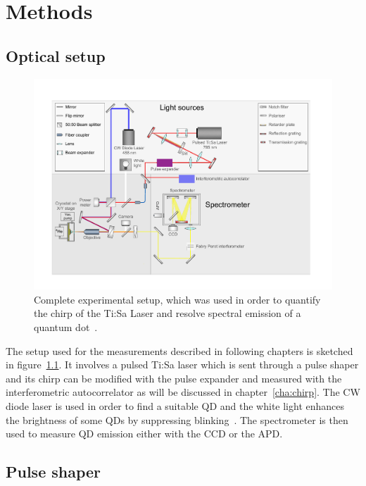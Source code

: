 \chapter{Methods}
\label{cha:methods}

\section{Optical setup}

\begin{figure}[H]
	\centering
	\includegraphics[width=1\linewidth]{figures/setup/Setup_flat}
	\caption[Complete experimental setup]{Complete experimental setup, which was used in order to quantify the chirp of the Ti:Sa Laser and resolve spectral emission of a quantum dot~\cite{schimpf_towards_2017}.}
	\label{fig:setupflat}
\end{figure}


The setup used for the measurements described in following chapters is sketched in figure~\ref{fig:setupflat}.
It involves a pulsed Ti:Sa laser which is sent through a pulse shaper and its chirp can be modified with the pulse expander and measured with the interferometric autocorrelator as will be discussed in chapter~\ref{cha:chirp}.
The CW diode laser is used in order to find a suitable \ac{QD} and the white light enhances the brightness of some \acp{QD} by suppressing blinking~\cite{jahn_artificial_2015}.
The spectrometer is then used to measure \ac{QD} emission either with the CCD or the APD.  

\section{Pulse shaper}


